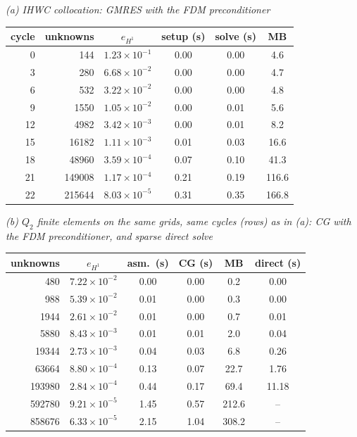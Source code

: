 \textit{(a) IHWC collocation: GMRES with the FDM preconditioner}\\[2pt]
\begin{tabular}{rr c ccc}
\toprule
cycle & unknowns & $e_{H^1}$ & setup (s) & solve (s) & MB\\
\midrule
0 & 144 & $1.23{\times}10^{-1}$ & 0.00 & 0.00 & 4.6\\
3 & 280 & $6.68{\times}10^{-2}$ & 0.00 & 0.00 & 4.7\\
6 & 532 & $3.22{\times}10^{-2}$ & 0.00 & 0.00 & 4.8\\
9 & 1550 & $1.05{\times}10^{-2}$ & 0.00 & 0.01 & 5.6\\
12 & 4982 & $3.42{\times}10^{-3}$ & 0.00 & 0.01 & 8.2\\
15 & 16182 & $1.11{\times}10^{-3}$ & 0.01 & 0.03 & 16.6\\
18 & 48960 & $3.59{\times}10^{-4}$ & 0.07 & 0.10 & 41.3\\
21 & 149008 & $1.17{\times}10^{-4}$ & 0.21 & 0.19 & 116.6\\
22 & 215644 & $8.03{\times}10^{-5}$ & 0.31 & 0.35 & 166.8\\
\bottomrule
\end{tabular}

\medskip
\textit{(b) $Q_2$ finite elements on the same grids, same cycles (rows) as in (a): CG with the FDM preconditioner, and sparse direct solve}\\[2pt]
\begin{tabular}{r c cccc}
\toprule
unknowns & $e_{H^1}$ & asm.\ (s) & CG (s) & MB & direct (s)\\
\midrule
480 & $7.22{\times}10^{-2}$ & 0.00 & 0.00 & 0.2 & 0.00\\
988 & $5.39{\times}10^{-2}$ & 0.01 & 0.00 & 0.3 & 0.00\\
1944 & $2.61{\times}10^{-2}$ & 0.01 & 0.00 & 0.7 & 0.01\\
5880 & $8.43{\times}10^{-3}$ & 0.01 & 0.01 & 2.0 & 0.04\\
19344 & $2.73{\times}10^{-3}$ & 0.04 & 0.03 & 6.8 & 0.26\\
63664 & $8.80{\times}10^{-4}$ & 0.13 & 0.07 & 22.7 & 1.76\\
193980 & $2.84{\times}10^{-4}$ & 0.44 & 0.17 & 69.4 & 11.18\\
592780 & $9.21{\times}10^{-5}$ & 1.45 & 0.57 & 212.6 & --\\
858676 & $6.33{\times}10^{-5}$ & 2.15 & 1.04 & 308.2 & --\\
\bottomrule
\end{tabular}

